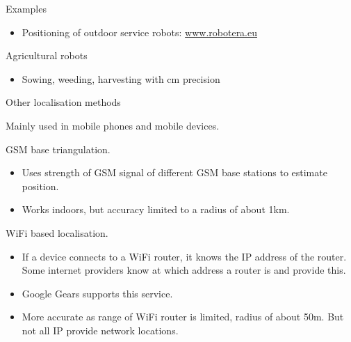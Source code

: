 \documentclass[compress]{beamer}
\providecommand{\tightlist}{%
  \setlength{\itemsep}{0pt}\setlength{\parskip}{0pt}}
\begin{document}
\begin{frame}{Examples}

\begin{itemize}
\tightlist
\item
  Positioning of outdoor service robots:
  \href{http://www.robotera.eu/}{www.robotera.eu}
\end{itemize}

Agricultural robots

\begin{itemize}
\tightlist
\item
  Sowing, weeding, harvesting with cm precision
\end{itemize}

\end{frame}

\begin{frame}{Other localisation methods}

Mainly used in mobile phones and mobile devices.

GSM base triangulation.

\begin{itemize}
\tightlist
\item
  Uses strength of GSM signal of different GSM base stations to estimate
  position.
\item
  Works indoors, but accuracy limited to a radius of about 1km.
\end{itemize}

WiFi based localisation.

\begin{itemize}
\tightlist
\item
  If a device connects to a WiFi router, it knows the IP address of the
  router. Some internet providers know at which address a router is and
  provide this.
\item
  Google Gears supports this service.
\item
  More accurate as range of WiFi router is limited, radius of about 50m.
  But not all IP provide network locations.
\end{itemize}

\end{frame}
\end{document}
